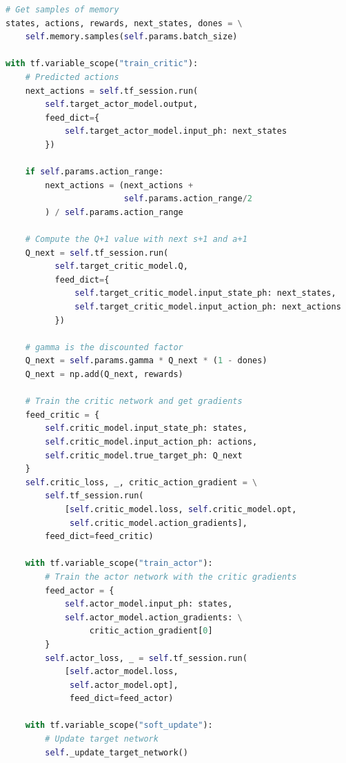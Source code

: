 \documentclass{article}
\begin{document}
\begin{lstlisting}[language=Python]
# Get samples of memory
states, actions, rewards, next_states, dones = \
    self.memory.samples(self.params.batch_size)

with tf.variable_scope("train_critic"):
    # Predicted actions
    next_actions = self.tf_session.run(
        self.target_actor_model.output,
        feed_dict={
            self.target_actor_model.input_ph: next_states
        })

    if self.params.action_range:
        next_actions = (next_actions +
                        self.params.action_range/2
        ) / self.params.action_range

    # Compute the Q+1 value with next s+1 and a+1
    Q_next = self.tf_session.run(
          self.target_critic_model.Q, 
          feed_dict={
              self.target_critic_model.input_state_ph: next_states,
              self.target_critic_model.input_action_ph: next_actions
          })

    # gamma is the discounted factor
    Q_next = self.params.gamma * Q_next * (1 - dones)
    Q_next = np.add(Q_next, rewards)

    # Train the critic network and get gradients
    feed_critic = {
        self.critic_model.input_state_ph: states,
        self.critic_model.input_action_ph: actions,
        self.critic_model.true_target_ph: Q_next
    }
    self.critic_loss, _, critic_action_gradient = \
        self.tf_session.run(
            [self.critic_model.loss, self.critic_model.opt,
             self.critic_model.action_gradients],
        feed_dict=feed_critic)

    with tf.variable_scope("train_actor"):
        # Train the actor network with the critic gradients
        feed_actor = {
            self.actor_model.input_ph: states,
            self.actor_model.action_gradients: \
                 critic_action_gradient[0]
        }
        self.actor_loss, _ = self.tf_session.run(
            [self.actor_model.loss,
             self.actor_model.opt],
             feed_dict=feed_actor)

    with tf.variable_scope("soft_update"):
        # Update target network
        self._update_target_network()
\end{lstlisting}
\end{document}
